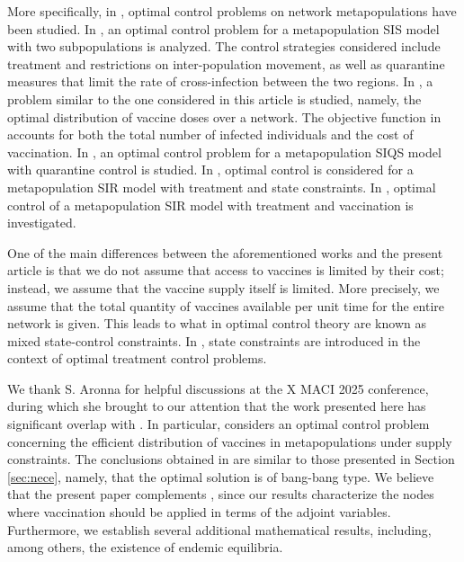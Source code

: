 \documentclass[a4paper,10pt]{article}
\theoremstyle{remark}
\begin{document}
More specifically, in \cite{Li-2019,rowthorn2009optimal,asano2008optimal,mbah2011resource,Chen-2014,Chen-2014b}, optimal control problems on network metapopulations have been studied. In \cite{rowthorn2009optimal}, an optimal control problem for a metapopulation SIS model with two subpopulations is analyzed. The control strategies considered include treatment and restrictions on inter-population movement, as well as quarantine measures that limit the rate of cross-infection between the two regions. In \cite{asano2008optimal}, a problem similar to the one considered in this article is studied, namely, the optimal distribution of vaccine doses over a network. The objective function in \cite{asano2008optimal} accounts for both the total number of infected individuals and the cost of vaccination. In \cite{Li-2019}, an optimal control problem for a metapopulation SIQS model with quarantine control is studied. In \cite{mbah2011resource}, optimal control is considered for a metapopulation SIR model with treatment and state constraints. In \cite{Chen-2014,Chen-2014b}, optimal control of a metapopulation SIR model with treatment and vaccination is investigated.

One of the main differences between the aforementioned works and the present article is that we do not assume that access to vaccines is limited by their cost; instead, we assume that the vaccine supply itself is limited. More precisely, we assume that the total quantity of vaccines available per unit time for the entire network is given. This leads to what in optimal control theory are known as mixed state-control constraints. In \cite{mbah2011resource,rowthorn2009optimal}, state constraints are introduced in the context of optimal treatment control problems.

We thank S. Aronna for helpful discussions at the X MACI 2025 conference, during which she brought to our attention that the work presented here has significant overlap with \cite{11018532, ARONNA20241198}. In particular, \cite{11018532} considers an optimal control problem concerning the efficient distribution of vaccines in metapopulations under supply constraints. The conclusions obtained in \cite{11018532} are similar to those presented in Section \ref{sec:nece}, namely, that the optimal solution is of bang-bang type. We believe that the present paper complements \cite{11018532}, since our results characterize the nodes where vaccination should be applied in terms of the adjoint variables. Furthermore, we establish several additional mathematical results, including, among others, the existence of endemic equilibria.
\end{document}
